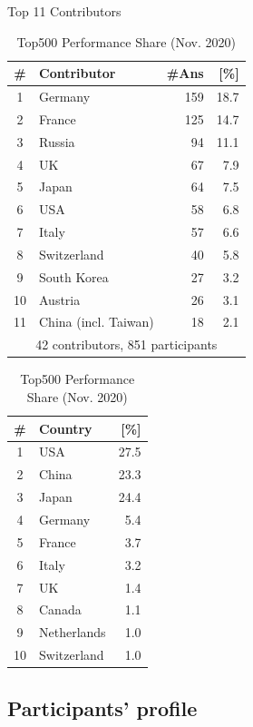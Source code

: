 \documentclass[preprint,5p,times]{elsarticle}
\def\Country{Contributor}%
\def\countries{contributors}%
\def\Countries{Contributors}%
\begin{document}
\begin{table}%
\begin{center}%
\caption{Top 11 \Countries}\label{tab:countries}%
\begin{tabular}{c|l|r|r}%
  \hline%
  \# & \Country & \#Ans & [\%] \\%
  \hline%
  1 & Germany 	& 159 & 18.7 \\%
  2 & France 	& 125 & 14.7 \\%
  3 & Russia 	& 94  & 11.1 \\%
  4 & UK 		& 67  &  7.9 \\%
  5 & Japan 	& 64  &  7.5 \\%
  6 & USA 	& 58  &  6.8 \\%
  7 & Italy 	& 57  &  6.6 \\%
  \hline%
  8 & Switzerland & 40  &  5.8 \\%
  9 & South Korea & 27  &  3.2 \\%
  10 & Austria 	& 26  &  3.1 \\%
  11 & China (incl. Taiwan) & 18 & 2.1 \\%
  \hline%
  \multicolumn{4}{c}{42 \countries, 851 participants} \\%
\end{tabular}%

\caption{Top500 Performance Share (Nov. 2020)}\label{tab:top500-share}%
  \begin{tabular}{c|l|r}%
    \hline%
    \# & Country & [\%] \\%
    \hline%
    1  & USA 	  & 27.5 \\%
    2  & China 	  & 23.3 \\%
    3  & Japan 	  & 24.4 \\%
    4  & Germany  &  5.4 \\%
    5  & France	  &  3.7 \\%
    6  & Italy	  &  3.2 \\%
    7  & UK	  &  1.4 \\%
    8  & Canada	  &  1.1 \\%
    9  & Netherlands  & 1.0 \\%
    10 & Switzerland  & 1.0 \\%
    \hline%
  \end{tabular}%
\end{center}%
\end{table}%

\subsection*{Participants' profile}
\end{document}
